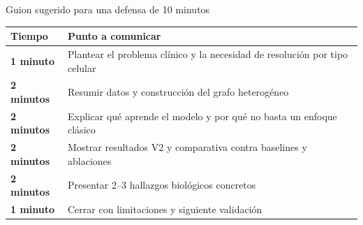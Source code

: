 \begin{frame}{Guion sugerido para una defensa de 10 minutos}
  \small
  \begin{tabularx}{\textwidth}{>{\bfseries}p{2.5cm}X}
    \toprule
    Tiempo & Punto a comunicar \\
    \midrule
    1 minuto & Plantear el problema cl\'inico y la necesidad de resoluci\'on por tipo celular \\
    2 minutos & Resumir datos y construcci\'on del grafo heterog\'eneo \\
    2 minutos & Explicar qu\'e aprende el modelo y por qu\'e no basta un enfoque cl\'asico \\
    2 minutos & Mostrar resultados V2 y comparativa contra baselines y ablaciones \\
    2 minutos & Presentar 2--3 hallazgos biol\'ogicos concretos \\
    1 minuto & Cerrar con limitaciones y siguiente validaci\'on \\
    \bottomrule
  \end{tabularx}
\end{frame}